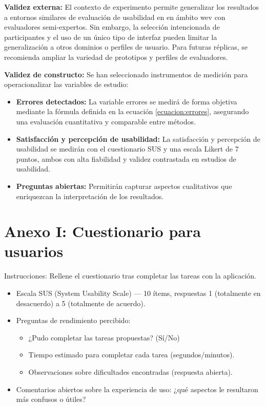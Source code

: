 \documentclass[a4paper,12pt]{report}
\begin{document}
\textbf{Validez externa:} El contexto de experimento permite generalizar los resultados a entornos similares de evaluación de usabilidad en en ámbito wev con evaluadores semi-expertos. Sin embargo, la selección 
intencionada de participantes y el uso de un único tipo de interfaz pueden limitar la generalización a otros dominios o perfiles de usuario. Para futuras réplicas, se recomienda ampliar la variedad de prototipos y perfiles de evaluadores.

\textbf{Validez de constructo:} Se han seleccionado instrumentos de medición para operacionalizar las variables de estudio: 
\begin{itemize}
    \item \textbf{Errores detectados:} La variable errores se medirá de forma objetiva mediante la fórmula definida en la ecuación \ref{ecuacion:errores}, asegurando una evaluación cuantitativa y comparable entre métodos.
    \item \textbf{Satisfacción y percepción de usabilidad:} La satisfacción y percepción de usabilidad se medirán con el cuestionario SUS y una escala Likert de 7 puntos, ambos con alta fiabilidad y validez contrastada en estudios de usabilidad.
    \item \textbf{Preguntas abiertas:} Permitirán capturar aspectos cualitativos que enriquezcan la interpretación de los resultados.
\end{itemize}

\cleardoublepage

\printbibliography[heading=bibintoc,title={Bibliografía}]
\appendix
\chapter{Anexo I: Cuestionario para usuarios}
\label{anexo:usuarios}

Instrucciones: Rellene el cuestionario tras completar las tareas con la aplicación.

\begin{itemize}
    \item Escala SUS (System Usability Scale) — 10 ítems, respuestas 1 (totalmente en desacuerdo) a 5 (totalmente de acuerdo).
    \item Preguntas de rendimiento percibido:
    \begin{itemize}
        \item ¿Pudo completar las tareas propuestas? (Sí/No)
        \item Tiempo estimado para completar cada tarea (segundos/minutos).
        \item Observaciones sobre dificultades encontradas (respuesta abierta).
    \end{itemize}
    \item Comentarios abiertos sobre la experiencia de uso: ¿qué aspectos le resultaron más confusos o útiles?
\end{itemize}
\end{document}
